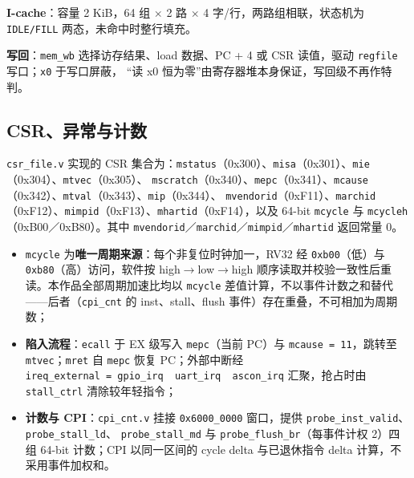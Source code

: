 \textbf{I-cache}：容量 2 KiB，64 组 $\times$ 2 路 $\times$ 4 字/行，两路组相联，状态机为 \texttt{IDLE/\allowbreak{}FILL} 两态，未命中时整行填充。

\textbf{写回}：\texttt{mem\_\allowbreak{}wb} 选择访存结果、load 数据、PC + 4 或 CSR 读值，驱动 \texttt{regfile} 写口；\texttt{x0} 于写口屏蔽， ``读 x0 恒为零''由寄存器堆本身保证，写回级不再作特判。


\Needspace{85pt}

\subsection{CSR、异常与计数}\label{csrux5f02ux5e38ux4e0eux8ba1ux6570}

\texttt{csr\_\allowbreak{}file.\allowbreak{}v} 实现的 CSR 集合为：\texttt{mstatus}（0x300）、\texttt{misa}（0x301）、\texttt{mie}（0x304）、\texttt{mtvec}（0x305）、 \texttt{mscratch}（0x340）、\texttt{mepc}（0x341）、\texttt{mcause}（0x342）、\texttt{mtval}（0x343）、\texttt{mip}（0x344）、 \texttt{mvendorid}（0xF11）、\texttt{marchid}（0xF12）、\texttt{mimpid}（0xF13）、\texttt{mhartid}（0xF14），以及 64-bit \texttt{mcycle} 与 \texttt{mcycleh}（0xB00／0xB80）。其中 \texttt{mvendorid}／\texttt{marchid}／\texttt{mimpid}／\texttt{mhartid} 返回常量 0。

\begin{itemize}
\tightlist
\item
  \texttt{mcycle} 为\textbf{唯一周期来源}：每个非复位时钟加一，RV32 经 \texttt{0xb00}（低）与 \texttt{0xb80}（高）访问，软件按 high$\rightarrow$low$\rightarrow$high 顺序读取并校验一致性后重读。本作品全部周期加速比均以 \texttt{mcycle} 差值计算，不以事件计数之和替代------后者（\texttt{cpi\_\allowbreak{}cnt} 的 inst、stall、flush 事件）存在重叠，不可相加为周期数；
\item
  \textbf{陷入流程}：\texttt{ecall} 于 EX 级写入 \texttt{mepc}（当前 PC）与 \texttt{mcause\ =\ 11}，跳转至 \texttt{mtvec}；\texttt{mret} 自 \texttt{mepc} 恢复 PC；外部中断经 \texttt{ireq\_external\ =\ gpio\_irq\ \textbar{}\ uart\_irq\ \textbar{}\ ascon\_irq} 汇聚，抢占时由 \texttt{stall\_\allowbreak{}ctrl} 清除较年轻指令；
\item
  \textbf{计数与 CPI}：\texttt{cpi\_\allowbreak{}cnt.\allowbreak{}v} 挂接 \texttt{0x6000\_\allowbreak{}0000} 窗口，提供 \texttt{probe\_\allowbreak{}inst\_\allowbreak{}valid}、\texttt{probe\_\allowbreak{}stall\_\allowbreak{}ld}、 \texttt{probe\_\allowbreak{}stall\_\allowbreak{}md} 与 \texttt{probe\_\allowbreak{}flush\_\allowbreak{}br}（每事件计权 2）四组 64-bit 计数；CPI 以同一区间的 cycle delta 与已退休指令 delta 计算，不采用事件加权和。
\end{itemize}

